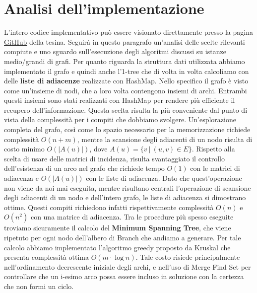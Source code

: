 \documentclass[
    article,            %
    12pt,                %
    oneside,            %
    a4paper,            %
    english,            %
    italian,                %
    sumario=tradicional,
]{abntex2}
\begin{document}
    \section{Analisi dell'implementazione}\label{sec:analisi-dell'implementazione}
    L'intero codice implementativo può essere visionato direttamente presso la pagina \href{https://github.com/LorenzoSciandra/TesinaOttimizzazioneCombinatoria}{GitHub} della tesina.
    Seguirà in questo paragrafo un'analisi delle scelte rilevanti compiute e uno sguardo sull'esecuzione degli algoritmi discussi su istanze medio/grandi di grafi.
    \newline
    \newline
    Per quanto riguarda la struttura dati utilizzata abbiamo implementato il grafo e quindi anche l'1-tree che di volta in volta calcoliamo con delle \textbf{liste di adiacenze} realizzate con HashMap.
    Nello specifico il grafo è visto come un'insieme di nodi, che a loro volta contengono insiemi di archi.
    Entrambi questi insiemi sono stati realizzati con HashMap per rendere più efficiente il recupero dell'informazione.
    Questa scelta risulta la più conveniente dal punto di vista della complessità per i compiti che dobbiamo svolgere.
    Un'esplorazione completa del grafo, così come lo spazio necessario per la memorizzazione richiede complessità $O(n+m)$, mentre la scansione degli adiacenti di un nodo risulta di costo minimo $O(|A(u)|)$, dove $A(u) = \{v \:|\: (u,v) \in E\}$.
    \newline
    Rispetto alla scelta di usare delle matrici di incidenza, risulta svantaggiato il controllo dell'esistenza di un arco nel grafo che richiede tempo $O(1)$ con le matrici di adiacenza e $O(|A(u)|)$ con le liste di adiacenza.
    Dato che quest'operazione non viene da noi mai eseguita, mentre risultano centrali l'operazione di scansione degli adiacenti di un nodo e dell'intero grafo, le liste di adiacenza si dimostrano ottime.
    Questi compiti richiedono infatti rispettivamente complessità $O(n)$ e $O(n^2)$ con una matrice di adiacenza.
    \newline
    \newline
    Tra le procedure più spesso eseguite troviamo sicuramente il calcolo del \textbf{Minimum Spanning Tree}, che viene ripetuto per ogni nodo dell'albero di Branch che andiamo a generare.
    Per tale calcolo abbiamo implementato l'algoritmo greedy proposto da Kruskal che presenta complessità ottima $O(m \cdot \log n)$.
    Tale costo risiede principalmente nell'ordinamento decrescente iniziale degli archi, e nell'uso di Merge Find Set per controllare che un i-esimo arco possa essere incluso in soluzione con la certezza che non formi un ciclo.
\end{document}
